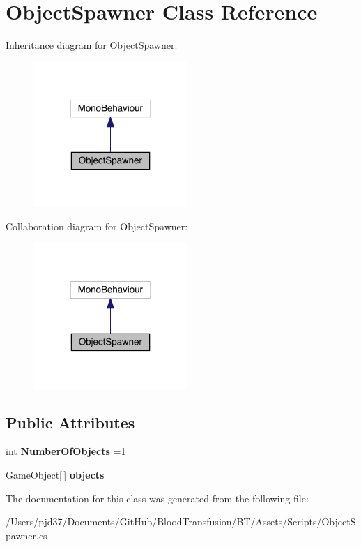 \hypertarget{class_object_spawner}{}\section{Object\+Spawner Class Reference}
\label{class_object_spawner}


Inheritance diagram for Object\+Spawner\+:\nopagebreak
\begin{figure}[H]
\begin{center}
\leavevmode
\includegraphics[width=166pt]{class_object_spawner__inherit__graph}
\end{center}
\end{figure}


Collaboration diagram for Object\+Spawner\+:\nopagebreak
\begin{figure}[H]
\begin{center}
\leavevmode
\includegraphics[width=166pt]{class_object_spawner__coll__graph}
\end{center}
\end{figure}
\subsection*{Public Attributes}
\begin{DoxyCompactItemize}
\item 
int {\bfseries Number\+Of\+Objects} =1\hypertarget{class_object_spawner_a2b1b88dfa80c9f520abbd0079f304cd1}{}\label{class_object_spawner_a2b1b88dfa80c9f520abbd0079f304cd1}

\item 
Game\+Object\mbox{[}$\,$\mbox{]} {\bfseries objects}\hypertarget{class_object_spawner_aac1b97ea559187fa0a9b92d0f45f015c}{}\label{class_object_spawner_aac1b97ea559187fa0a9b92d0f45f015c}

\end{DoxyCompactItemize}


The documentation for this class was generated from the following file\+:\begin{DoxyCompactItemize}
\item 
/\+Users/pjd37/\+Documents/\+Git\+Hub/\+Blood\+Transfusion/\+B\+T/\+Assets/\+Scripts/Object\+Spawner.\+cs\end{DoxyCompactItemize}
